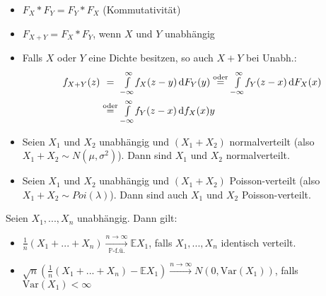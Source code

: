 \documentclass{cheat-sheet}
\renewcommand{\P}{\mathbb{P}} %
\newcommand{\E}{\mathbb{E}} %
\newcommand{\Var}{\mathrm{Var}} %
\begin{document}
\begin{prop}
  \begin{itemize}
    \item $F_X * F_Y = F_Y * F_X$ (Kommutativität)
    \item $F_{X + Y} = F_X * F_Y$, wenn $X$ und $Y$ unabhängig
    \item Falls $X$ oder $Y$ eine Dichte besitzen, so auch $X {+} Y$ bei Unabh.:
    \begin{align*}
      f_{X+Y}(z) &\overset{\phantom{\text{oder}}}= \Int{-\infty}{\infty}{f_X(z-y)}{F_Y(y)} \overset{\text{oder}}= \Int{-\infty}{\infty}{f_Y(z-x)}{F_X(x)} \\
      &\overset{\text{oder}}= \Int{-\infty}{\infty}{f_Y(z-x)}{f_X(x)}{y}
    \end{align*}
  \end{itemize}
\end{prop}

\iffalse
  \begin{bsp}
    $X_i$ sei Poisson-verteilt mit Paramter $\lambda_i > 0$, $i = 1, 2$. Dann ist $X_1 + X_2$ Poisson-verteilt mit Parameter $\lambda_1 + \lambda_2$, falls $X_1$ und $X_2$ unabhängig sind.
  \end{bsp}

  \begin{bsp}
    Sei $X_i \overbrace{=}^{d} N(\mu_i, \sigma_i^2)$, $i = 1,2$ unabhängig. Dann: $X_1 + X_2 \overbrace{=}^{d} N(\mu_1 + \mu_2, \sigma_1^2 + \sigma_2^2)$.
  \end{bsp}
\fi

\begin{satz}
  \begin{itemize}
    \item Seien $X_1$ und $X_2$ unabhängig und $(X_1 {+} X_2)$ normalverteilt (also $X_1 + X_2 \sim N(\mu, \sigma^2)$). Dann sind $X_1$ und $X_2$ normalverteilt.
    \item Seien $X_1$ und $X_2$ unabhängig und $(X_1 {+} X_2)$ Poisson-verteilt (also $X_1 + X_2 \sim Poi(\lambda)$). Dann sind auch $X_1$ und $X_2$ Poisson-verteilt.
  \end{itemize}
\end{satz}

\begin{satz}
  Seien $X_1, ..., X_n$ unabhängig. Dann gilt:
  \begin{itemize}
    \item $\tfrac{1}{n}(X_1 + ... + X_n) \xrightarrow[\text{$\P$-f.ü.}]{n \to \infty} \E X_1$, falls $X_1, ..., X_n$ identisch verteilt. %
    \item $\sqrt{n} (\tfrac{1}{n}(X_1 + ... + X_n) - \E X_1) \xrightarrow{n \to \infty} N(0, \Var(X_1))$, falls $\Var(X_1) < \infty$
  \end{itemize}
\end{satz}
\end{document}
